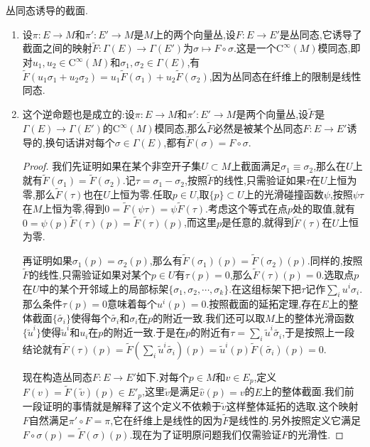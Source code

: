丛同态诱导的截面.
\begin{enumerate}
	\item 设$\pi:E\to M$和$\pi':E'\to M$是$M$上的两个向量丛,设$F:E\to E'$是丛同态,它诱导了截面之间的映射$\widetilde{F}:\Gamma(E)\to\Gamma(E')$为$\sigma\mapsto F\circ\sigma$.这是一个$\mathrm{C}^{\infty}(M)$模同态,即对$u_1,u_2\in\mathrm{C}^{\infty}(M)$和$\sigma_1,\sigma_2\in\Gamma(E)$,有$\widetilde{F}(u_1\sigma_1+u_2\sigma_2)=u_1\widetilde{F}(\sigma_1)+u_2\widetilde{F}(\sigma_2)$,因为丛同态在纤维上的限制是线性同态.
	\item 这个逆命题也是成立的:设$\pi:E\to M$和$\pi':E'\to M$是两个向量丛,设$\widetilde{F}$是$\Gamma(E)\to\Gamma(E')$的$\mathrm{C}^{\infty}(M)$模同态,那么$\widetilde{F}$必然是被某个丛同态$F:E\to E'$诱导的,换句话讲对每个$\sigma\in\Gamma(E)$,都有$\widetilde{F}(\sigma)=F\circ\sigma$.
	\begin{proof}
		
		我们先证明如果在某个非空开子集$U\subset M$上截面满足$\sigma_1\equiv\sigma_2$,那么在$U$上就有$\widetilde{F}(\sigma_1)=\widetilde{F}(\sigma_2)$.记$\tau=\sigma_1-\sigma_2$,按照$\widetilde{F}$的线性,只需验证如果$\tau$在$U$上恒为零,那么$\widetilde{F}(\tau)$也在$U$上恒为零.任取$p\in U$,取$\{p\}\subset U$上的光滑碰撞函数$\psi$,按照$\psi\tau$在$M$上恒为零,得到$0=\widetilde{F}(\psi\tau)=\psi\widetilde{F}(\tau)$.考虑这个等式在点$p$处的取值,就有$0=\psi(p)\widetilde{F}(\tau)(p)=\widetilde{F}(\tau)(p)$,而这里$p$是任意的,就得到$\widetilde{F}(\tau)$在$U$上恒为零.
		
		再证明如果$\sigma_1(p)=\sigma_2(p)$,那么有$\widetilde{F}(\sigma_1)(p)=\widetilde{F}(\sigma_2)(p)$.同样的,按照$\widetilde{F}$的线性,只需验证如果对某个$p\in U$有$\tau(p)=0$,那么$\widetilde{F}(\tau)(p)=0$.选取点$p$在$U$中的某个开邻域上的局部标架$\{\sigma_1,\sigma_2,\cdots,\sigma_k\}$.在这组标架下把$\tau$记作$\sum_iu^i\sigma_i$.那么条件$\tau(p)=0$意味着每个$u^i(p)=0$.按照截面的延拓定理,存在$E$上的整体截面$\{\widetilde{\sigma_i}\}$使得每个$\widetilde{\sigma_i}$和$\sigma_i$在$p$的附近一致.我们还可以取$M$上的整体光滑函数$\{\widetilde{u}^i\}$使得$\widetilde{u}^i$和$u_i$在$p$的附近一致.于是在$p$的附近有$\tau=\sum_i\widetilde{u}^i\widetilde{\sigma_i}$,于是按照上一段结论就有$\widetilde{F}(\tau)(p)=\widetilde{F}(\sum_i\widetilde{u}^i\widetilde{\sigma_i})(p)=\widetilde{u}^i(p)\widetilde{F}(\widetilde{\sigma_i})(p)=0$.
		
		现在构造丛同态$F:E\to E'$如下.对每个$p\in M$和$v\in E_p$,定义$F(v)=\widetilde{F}(\widetilde{v})(p)\in E'_p$,这里$\widetilde{v}$是满足$\widehat{v}(p)=v$的$E$上的整体截面.我们前一段证明的事情就是解释了这个定义不依赖于$\widetilde{v}$这样整体延拓的选取.这个映射$F$自然满足$\pi'\circ F=\pi$,它在纤维上是线性的因为$\widetilde{F}$是线性的.另外按照定义它满足$F\circ\sigma(p)=\widetilde{F}(\sigma)(p)$.现在为了证明原问题我们仅需验证$F$的光滑性.
		

\end{proof}
\end{enumerate}
